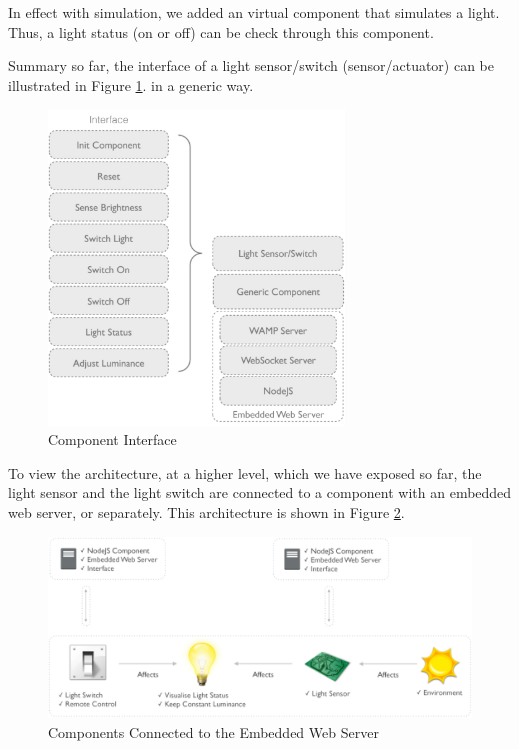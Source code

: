In effect with simulation, we added an virtual component that simulates a light. Thus, a light status (on or off) can be check through this component. 

Summary so far, the interface of a light sensor/switch (sensor/actuator) can be illustrated in Figure \ref{fig:component-interface}. in a generic way.

\begin{figure}[ht]
  \begin{center}
    \includegraphics[width=0.7\textwidth]{images/component-interface.pdf}
    \caption{Component Interface}
    \label{fig:component-interface}
  \end{center}
\end{figure}

To view the architecture, at a higher level, which we have exposed so far, the light sensor and the light switch are connected to a component with an embedded web server, or separately. This architecture is shown in Figure \ref{fig:component-nodeJS-interface}.

\begin{figure}[ht]
  \begin{center}
    \includegraphics[width=1\textwidth]{images/component-nodeJS-interface.pdf}
    \caption{Components Connected to the Embedded Web Server}
    \label{fig:component-nodeJS-interface}
  \end{center}
\end{figure}


